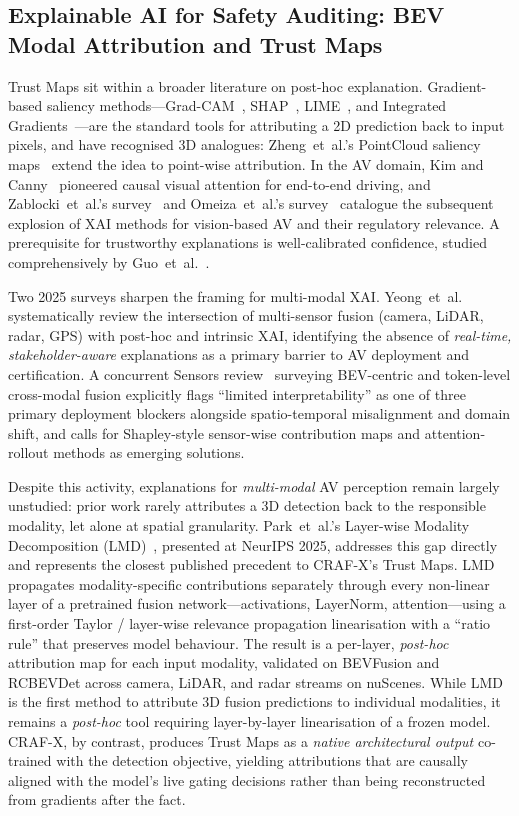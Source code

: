 \subsection{Explainable AI for Safety Auditing: BEV Modal Attribution and Trust Maps}

Trust Maps sit within a broader literature on post-hoc explanation.
Gradient-based saliency methods---Grad-CAM~\cite{SelvarajuGradCAM2017},
SHAP~\cite{LundbergSHAP2017}, LIME~\cite{RibeiroLIME2016}, and
Integrated Gradients~\cite{SundararajanIG2017}---are the standard tools
for attributing a 2D prediction back to input pixels, and have
recognised 3D analogues: Zheng~et~al.'s PointCloud
saliency maps~\cite{ZhengPCSaliency2019} extend the idea to point-wise
attribution.
In the AV domain, Kim and Canny~\cite{KimCausal2017} pioneered causal
visual attention for end-to-end driving, and Zablocki~et~al.'s
survey~\cite{ZablockiSurvey2022} and Omeiza~et~al.'s
survey~\cite{OmeizaSurvey2022} catalogue the subsequent explosion of
XAI methods for vision-based AV and their regulatory relevance. A
prerequisite for trustworthy explanations is well-calibrated
confidence, studied comprehensively by Guo~et~al.~\cite{GuoCalibration2017}.

Two 2025 surveys sharpen the framing for multi-modal XAI.
Yeong~et~al.~\cite{YeongXAIAV2025} systematically review the intersection
of multi-sensor fusion (camera, LiDAR, radar, GPS) with post-hoc and
intrinsic XAI, identifying the absence of \emph{real-time, stakeholder-aware}
explanations as a primary barrier to AV deployment and certification.
A concurrent Sensors review~\cite{SensorsMSFReview2025} surveying BEV-centric
and token-level cross-modal fusion explicitly flags ``limited interpretability''
as one of three primary deployment blockers alongside spatio-temporal
misalignment and domain shift, and calls for Shapley-style sensor-wise
contribution maps and attention-rollout methods as emerging solutions.

Despite this activity, explanations for \emph{multi-modal} AV perception
remain largely unstudied: prior work rarely attributes a 3D detection back
to the responsible modality, let alone at spatial granularity.
Park~et~al.'s Layer-wise Modality Decomposition
(LMD)~\cite{ParkLMD2025}, presented at NeurIPS 2025, addresses this
gap directly and represents the closest published precedent to CRAF-X's
Trust Maps. LMD propagates modality-specific contributions separately
through every non-linear layer of a pretrained fusion network---activations,
LayerNorm, attention---using a first-order Taylor / layer-wise relevance
propagation linearisation with a ``ratio rule'' that preserves model
behaviour. The result is a per-layer, \emph{post-hoc} attribution map for
each input modality, validated on BEVFusion and RCBEVDet across camera,
LiDAR, and radar streams on nuScenes. While LMD is the first method to
attribute 3D fusion predictions to individual modalities, it remains a
\emph{post-hoc} tool requiring layer-by-layer linearisation of a frozen
model. CRAF-X, by contrast, produces Trust Maps as a \emph{native
architectural output} co-trained with the detection objective, yielding
attributions that are causally aligned with the model's live gating
decisions rather than being reconstructed from gradients after the fact.

